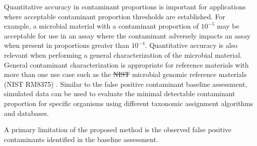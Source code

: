 \documentclass[fleqn,10pt,lineno]{wlpeerj}\usepackage[]{graphicx}\usepackage[]{color}
\providecommand{\DIFdeltex}[1]{{\protect\color{red}\sout{#1}}}                      %
\providecommand{\DIFaddbegin}{} %
\providecommand{\DIFaddend}{} %
\providecommand{\DIFdelbegin}{} %
\providecommand{\DIFdelend}{} %
\providecommand{\DIFdel}[1]{\texorpdfstring{\DIFdeltex{#1}}{}} %
\begin{document}
\DIFaddend Quantitative accuracy in contaminant proportions is important for applications where acceptable contaminant proportion thresholds are established.
For example, a microbial material with a contaminant proportion of $10^{-5}$ may be acceptable for use in an assay where the contaminant adversely impacts an assay when present in proportions greater than $10^{-4}$.
Quantitative accuracy is also relevant when performing a general characterization of the microbial material.
General contaminant characterization is appropriate for reference materials with more than one use case such as the \DIFdelbegin \DIFdel{NIST }\DIFdelend microbial genomic reference materials (NIST RM8375) \citep{olson2016pepr}.
Similar to the false positive contaminant baseline assessment,
simulated data can be used to evaluate the minimal detectable contaminant proportion for specific organisms using different taxonomic assignment algorithms and databases.
\DIFdelbegin %

\DIFdelend A primary limitation of the proposed method is the observed false positive contaminants identified in the baseline assessment.  
\DIFaddbegin 
\end{document}
